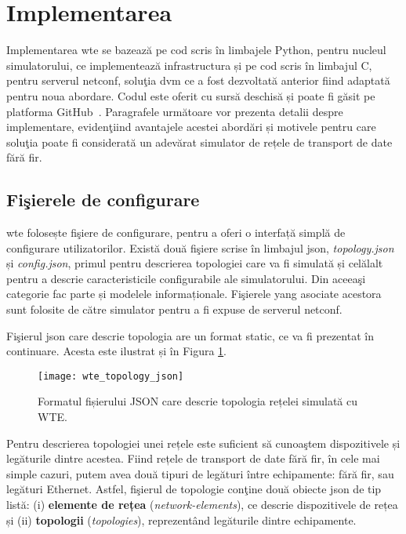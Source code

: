 \section{Implementarea}

Implementarea \gls{wte} se bazează pe cod scris în limbajele Python, pentru nucleul simulatorului, ce implementează infrastructura și pe cod scris în limbajul C, pentru serverul \gls{netconf}, soluţia \gls{dvm} ce a fost dezvoltată anterior fiind adaptată pentru noua abordare. Codul este oferit cu sursă deschisă și poate fi găsit pe platforma GitHub~\cite{wte2017}. Paragrafele următoare vor prezenta detalii despre implementare, evidenţiind avantajele acestei abordări și motivele pentru care soluţia poate fi considerată un adevărat simulator de rețele de transport de date fără fir. 

\subsection{Fişierele de configurare}

\gls{wte} folosește fişiere de configurare, pentru a oferi o interfață simplă de configurare utilizatorilor. Există două fişiere scrise în limbajul \gls{json}, \textit{topology.json} și \textit{config.json}, primul pentru descrierea topologiei care va fi simulată și celălalt pentru a descrie caracteristicile configurabile ale simulatorului. Din aceeaşi categorie fac parte și modelele informaționale. Fişierele \gls{yang} asociate acestora sunt folosite de către simulator pentru a fi expuse de serverul \gls{netconf}.

Fişierul \gls{json} care descrie topologia are un format static, ce va fi prezentat în continuare. Acesta este ilustrat și în Figura \ref{fig:wte_topology_json}.

\begin{figure}[h]
	\centering
	\texttt{[image: wte\_topology\_json]}
	\caption{Formatul fișierului JSON care descrie topologia rețelei simulată cu WTE.}
	\label{fig:wte_topology_json}
\end{figure}

Pentru descrierea topologiei unei rețele este suficient să cunoaştem dispozitivele și legăturile dintre acestea. Fiind rețele de transport de date fără fir, în cele mai simple cazuri, putem avea două tipuri de legături între echipamente: fără fir, sau legături Ethernet. Astfel, fişierul de topologie conţine două obiecte \gls{json} de tip listă: (i) \textbf{elemente de rețea} (\textit{network-elements}), ce descrie dispozitivele de rețea și (ii) \textbf{topologii} (\textit{topologies}), reprezentând legăturile dintre echipamente.

